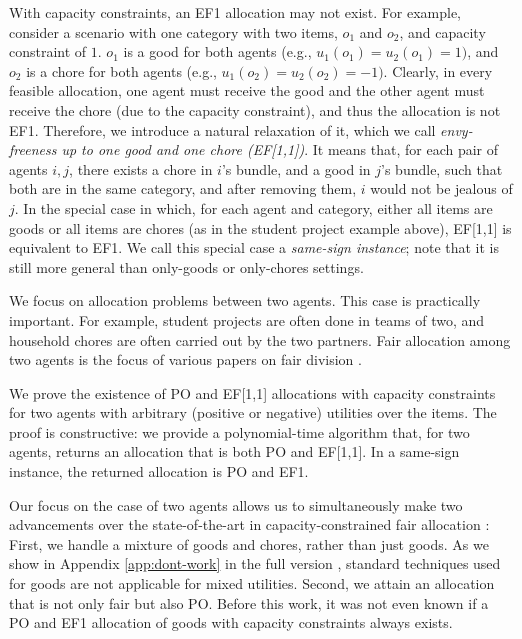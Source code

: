 \documentclass[sigconf]{aamas}
\theoremstyle{definition}
\begin{document}
With capacity constraints, an EF1 allocation may not exist. For example, consider a scenario with one category with two items, $o_1$ and $o_2$, and capacity constraint of $1$. $o_1$ is a good for both agents (e.g., $u_1(o_1)=u_2(o_1)=1)$, and $o_2$ is a chore for both agents (e.g., $u_1(o_2)=u_2(o_2)=-1)$. Clearly, in every feasible allocation, one agent must receive the good and the other agent must receive the chore (due to the capacity constraint), and thus the allocation is not EF1.
Therefore, we introduce a natural relaxation of it, which we call
\emph{envy-freeness up to one good and one chore (EF[1,1])}. It means that,
for each pair of agents $i,j$, there exists a chore in $i$'s bundle, and a good in $j$'s bundle, such that both are in the same category, and after removing them,
$i$ would not be jealous of $j$. 
In the special case in which, for each agent and category, either all items are goods or all items are chores (as in the student project example above), EF[1,1] is equivalent to EF1. We call this special case a \emph{same-sign instance}; note that it is still more general than only-goods or only-chores settings.

We focus on allocation problems between two agents. This case is practically important. For example, student projects are often done in teams of two, and household chores are often  carried out by the two partners. Fair allocation among two agents is the focus of various papers on fair division \cite{2.08.nicolo2008strategic,2.12.brams2012undercut,2.14.brams2014two,2.15.aziz2015note,2.17.nicolo2017divide,2.18.kilgour2018two,2.22.tucker2022playing,Brczi2020}.

We prove the existence of PO and EF[1,1] allocations with capacity constraints
for two agents with arbitrary (positive or negative) utilities over the items.
The proof is constructive:
we provide a polynomial-time algorithm that, for two agents, returns an allocation that is both PO and EF[1,1]. In a same-sign instance, the returned allocation is PO and EF1.

Our focus on the case of two agents allows us to simultaneously make two advancements over the state-of-the-art in capacity-constrained fair allocation \cite{biswas2018,dror2021fair}:
First, we handle a mixture of goods and chores, rather than just goods. As we show in Appendix \ref{app:dont-work} in the full version \citep{shoshan2022efficient},
standard techniques used for goods are not applicable for mixed utilities.
Second, we attain an allocation that is not only fair but also PO.
Before this work, it was not even known if a PO and EF1 allocation of goods with capacity constraints always exists.
\end{document}

